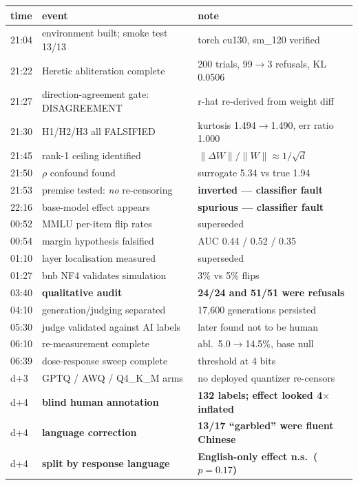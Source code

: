 \begin{tabular}{lp{3.3cm}p{3.2cm}}
\toprule
time & event & note \\
\midrule
21:04 & environment built; smoke test 13/13 & torch cu130, sm\_120 verified \\
21:22 & Heretic abliteration complete & 200 trials, 99$\to$3 refusals, KL 0.0506 \\
21:27 & direction-agreement gate: DISAGREEMENT & r-hat re-derived from weight diff \\
21:30 & H1/H2/H3 all FALSIFIED & kurtosis 1.494$\to$1.490, err ratio 1.000 \\
21:45 & rank-1 ceiling identified & $\|\Delta W\|/\|W\| \approx 1/\sqrt{d}$ \\
21:50 & $\rho$ confound found & surrogate 5.34 vs true 1.94 \\
21:53 & premise tested: \emph{no} re-censoring & \textbf{inverted --- classifier fault} \\
22:16 & base-model effect appears & \textbf{spurious --- classifier fault} \\
00:52 & MMLU per-item flip rates & superseded \\
00:54 & margin hypothesis falsified & AUC 0.44 / 0.52 / 0.35 \\
01:10 & layer localisation measured & superseded \\
01:27 & bnb NF4 validates simulation & 3\% vs 5\% flips \\
03:40 & \textbf{qualitative audit} & \textbf{24/24 and 51/51 were refusals} \\
04:10 & generation/judging separated & 17{,}600 generations persisted \\
05:30 & judge validated against AI labels & later found not to be human \\
06:10 & re-measurement complete & abl.\ 5.0$\to$14.5\%, base null \\
06:39 & dose-response sweep complete & threshold at 4 bits \\
d+3 & GPTQ / AWQ / Q4\_K\_M arms & no deployed quantizer re-censors \\
d+4 & \textbf{blind human annotation} & \textbf{132 labels; effect looked 4$\times$ inflated} \\
d+4 & \textbf{language correction} & \textbf{13/17 ``garbled'' were fluent Chinese} \\
d+4 & \textbf{split by response language} & \textbf{English-only effect n.s.\ ($p=0.17$)} \\
\bottomrule
\end{tabular}
